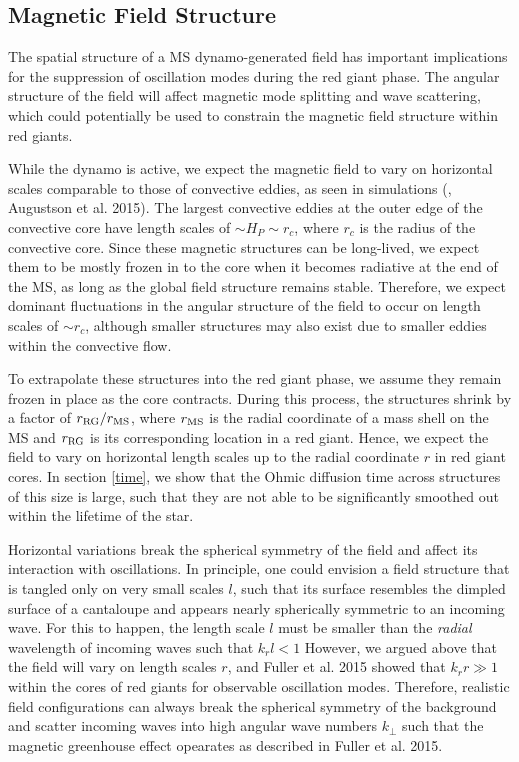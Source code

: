 \subsection{Magnetic Field Structure}
\label{fieldstruc}

The spatial structure of a MS dynamo-generated field has important implications for the suppression of oscillation modes during the red giant phase.
The angular structure of the field will affect magnetic mode splitting and wave scattering, which could potentially be used to constrain the magnetic field structure within red giants.

While the dynamo is active, we expect the magnetic field to vary on horizontal scales comparable to those of convective eddies, as seen in simulations (\citealt{Featherstone_2009}, Augustson et al. 2015). The largest convective eddies at the outer edge of the convective core have length scales of $\sim \! H_P \sim \! r_c$, where $r_c$ is the radius of the convective core. Since these magnetic structures can be long-lived, we expect them to be mostly frozen in to the core when it becomes radiative at the end of the MS, as long as the global field structure remains stable. Therefore, we expect dominant fluctuations in the angular structure of the field to occur on length scales of $\sim \! r_c$, although smaller structures may also exist due to smaller eddies within the convective flow.

To extrapolate these structures into the red giant phase, we assume they remain frozen in place as the core contracts. During this process, the structures shrink by a factor of $r_{\rm RG}/r_{\rm MS}$, where $r_{\rm MS}$ is the radial coordinate of a mass shell on the MS and $r_{\rm RG}$ is its corresponding location in a red giant. Hence, we expect the field to vary on horizontal length scales up to the radial coordinate $r$ in red giant cores. In section \ref{time}, we show that the Ohmic diffusion time across structures of this size is large, such that they are not able to be significantly smoothed out within the lifetime of the star.

Horizontal variations break the spherical symmetry of the field and affect its interaction with oscillations. In principle, one could envision a field structure that is tangled only on very small scales $l$, such that its surface resembles the dimpled surface of a cantaloupe and appears nearly spherically symmetric to an incoming wave. For this to happen, the length scale $l$ must be smaller than the {\it radial} wavelength of incoming waves such that $k_r l < 1$ However, we argued above that the field will vary on length scales $r$, and Fuller et al. 2015 showed that $k_r r \gg 1$ within the cores of red giants for observable oscillation modes. Therefore, realistic field configurations can always break the spherical symmetry of the background and scatter incoming waves into high angular wave numbers $k_\perp$ such that the magnetic greenhouse effect opearates as described in Fuller et al. 2015.